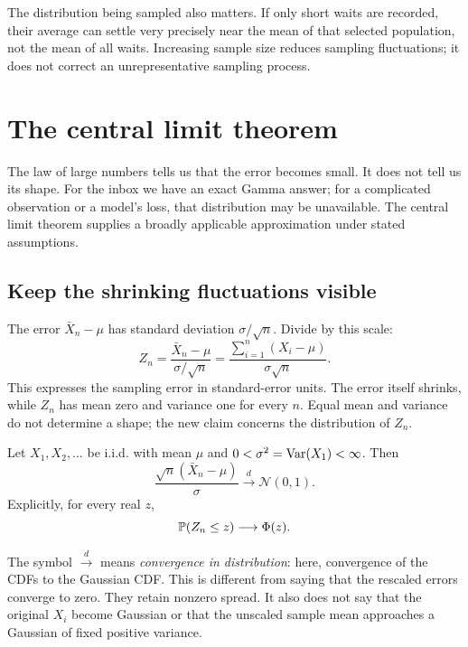 The distribution being sampled also matters. If only short waits are
recorded, their average can settle very precisely near the mean of that
selected population, not the mean of all waits. Increasing sample size
reduces sampling fluctuations; it does not correct an unrepresentative
sampling process.

\section{The central limit theorem}
\label{sec:clt}

The law of large numbers tells us that the error becomes small. It does
not tell us its shape. For the inbox we have an exact Gamma answer;
for a complicated observation or a model's loss, that distribution may
be unavailable. The central limit theorem supplies a broadly applicable
approximation under stated assumptions.

\subsection{Keep the shrinking fluctuations visible}

The error \(\bar X_n-\mu\) has standard deviation
\(\sigma/\sqrt n\). Divide by this scale:
\[
  Z_n=\frac{\bar X_n-\mu}{\sigma/\sqrt n}
     =\frac{\sum_{i=1}^n(X_i-\mu)}{\sigma\sqrt n}.
\]
This expresses the sampling error in standard-error units. The error
itself shrinks, while \(Z_n\) has mean zero and variance one for every
\(n\). Equal mean and variance do not determine a shape; the new
claim concerns the distribution of \(Z_n\).

\begin{theorem}
Let \(X_1,X_2,\ldots\) be i.i.d. with mean \(\mu\) and
\(0<\sigma^2=\operatorname{Var}(X_1)<\infty\). Then
\begin{equation}
  \frac{\sqrt n(\bar X_n-\mu)}{\sigma}
  \xrightarrow{d}\mathcal N(0,1).
  \label{eq:clt}
\end{equation}
Explicitly, for every real \(z\),
\[
  \mathbb{P}(Z_n\le z)\longrightarrow\Phi(z).
\]
\end{theorem}

The symbol \(\xrightarrow{d}\) means \emph{convergence in distribution}:
here, convergence of the CDFs to the Gaussian CDF. This is different
from saying that the rescaled errors converge to zero. They retain
nonzero spread. It also does not say that the original \(X_i\) become
Gaussian or that the unscaled sample mean approaches a Gaussian of
fixed positive variance.


